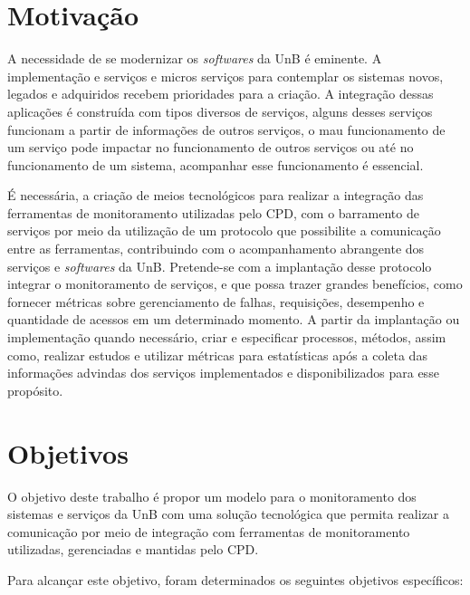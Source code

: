 
\section{Motivação}

A necessidade de se modernizar os \textit{softwares} da \acrshort{UnB} é eminente. A implementação e serviços e micros serviços para contemplar os sistemas novos, legados e adquiridos recebem prioridades para a criação. A integração dessas aplicações é construída com tipos diversos de serviços, alguns desses serviços funcionam a partir de informações de  outros serviços, o mau funcionamento de um serviço pode impactar no funcionamento de outros serviços ou até no funcionamento de um sistema, acompanhar esse funcionamento é essencial.      

É necessária, a criação de meios tecnológicos para realizar a integração das ferramentas de monitoramento utilizadas pelo \acrshort{CPD}, com o barramento de serviços por meio da utilização de um protocolo que possibilite a comunicação entre as ferramentas, contribuindo com o acompanhamento abrangente dos serviços e \textit{softwares} da \acrshort{UnB}. Pretende-se com a implantação desse protocolo integrar o monitoramento de serviços, e que possa trazer grandes benefícios, como fornecer métricas sobre gerenciamento de falhas, requisições, desempenho e quantidade de acessos em um determinado momento. A partir da implantação ou implementação quando necessário, criar e especificar processos, métodos, assim como, realizar estudos e utilizar métricas para estatísticas após a coleta das informações advindas dos serviços implementados e disponibilizados para esse propósito.



\section{Objetivos}
\label{objetivos}

O objetivo deste trabalho é propor um modelo para o monitoramento dos sistemas e serviços da \acrfull{UnB} com uma solução tecnológica que permita realizar a comunicação por meio de integração com ferramentas de monitoramento utilizadas, gerenciadas e mantidas pelo \acrfull{CPD}.

Para alcançar este objetivo, foram determinados os seguintes objetivos específicos:


